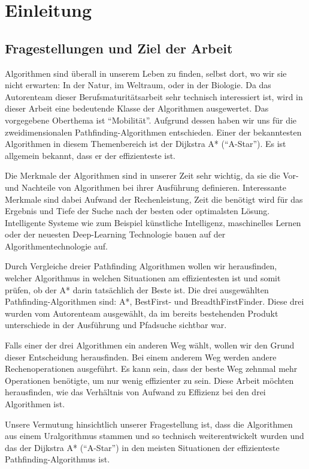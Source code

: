 \chapter{Einleitung}
\section{Fragestellungen und Ziel der Arbeit}
Algorithmen sind überall in unserem Leben zu finden, selbst dort, wo wir sie nicht erwarten: In der Natur, im Weltraum, oder in der Biologie. Da das Autorenteam dieser Berufsmaturitätsarbeit sehr technisch interessiert ist, wird in dieser Arbeit eine bedeutende Klasse der Algorithmen ausgewertet. Das vorgegebene Oberthema ist ``Mobilität''. Aufgrund dessen haben wir uns für die zweidimensionalen Pathfinding-Algorithmen entschieden. Einer der bekanntesten Algorithmen in diesem Themenbereich ist der Dijkstra A* (``A-Star''). Es ist allgemein bekannt, dass er der effizienteste ist. 

Die Merkmale der Algorithmen sind in unserer Zeit sehr wichtig, da sie die Vor- und Nachteile von Algorithmen bei ihrer Ausführung definieren. Interessante Merkmale sind dabei Aufwand der Rechenleistung, Zeit die benötigt wird für das Ergebnis und Tiefe der Suche nach der besten oder optimalsten Lösung. Intelligente Systeme wie zum Beispiel künstliche Intelligenz, maschinelles Lernen oder der neuesten Deep-Learning Technologie bauen auf der Algorithmentechnologie auf.


Durch Vergleiche dreier Pathfinding Algorithmen wollen wir herausfinden, welcher Algorithmus in welchen Situationen am effizientesten ist und somit prüfen, ob der A* darin tatsächlich der Beste ist. Die drei ausgewählten Pathfinding-Algorithmen sind: A*, BestFirst- und BreadthFirstFinder. Diese drei wurden vom Autorenteam ausgewählt, da im bereits bestehenden Produkt unterschiede in der Ausführung und Pfadsuche sichtbar war.


Falls einer der drei Algorithmen ein anderen Weg wählt, wollen wir den Grund dieser Entscheidung herausfinden. Bei einem anderem Weg werden andere Rechenoperationen ausgeführt. Es kann sein, dass der beste Weg zehnmal mehr Operationen benötigte, um nur wenig effizienter zu sein. Diese Arbeit möchten herausfinden, wie das Verhältnis von Aufwand zu Effizienz bei den drei Algorithmen ist.


Unsere Vermutung hinsichtlich unserer Fragestellung ist, dass die Algorithmen aus einem Uralgorithmus stammen und so technisch weiterentwickelt wurden und das der Dijkstra A* (``A-Star'') in den meisten Situationen der effizienteste Pathfinding-Algorithmus ist. \cite[Andrew Walker, StackOverflow, 2012]{isastarbest}

